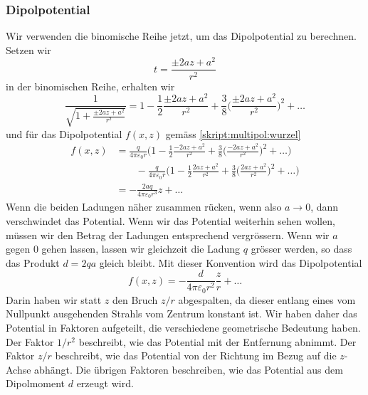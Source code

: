 \subsubsection{Dipolpotential}
Wir verwenden die binomische Reihe jetzt, um das Dipolpotential
zu berechnen.
Setzen wir 
\[
t=\frac{\pm 2az+a^2}{r^2}
\]
in der binomischen Reihe, erhalten wir
\[
\frac{1}{\sqrt{\displaystyle 1+\frac{\pm 2az+a^2}{r^2}}}
=
1-\frac12\frac{\pm 2az+a^2}{r^2}
+
\frac38 \biggl(\frac{\pm 2az+a^2}{r^2}\biggr)^2+\dots
\]
und für das Dipolpotential $f(x,z)$ gemäss \eqref{skript:multipol:wurzel}
\begin{align*}
f(x,z)
&=
\frac{q}{4\pi\varepsilon_0 r}
\biggl(
1-\frac12\frac{-2az+a^2}{r^2} + \frac38 \biggl(\frac{-2az+a^2}{r^2}\biggr)^2+\dots
\biggr)
\\
&\qquad
-
\frac{q}{4\pi\varepsilon_0 r}
\biggl(
1-\frac12\frac{2az+a^2}{r^2} + \frac38 \biggl(\frac{2az+a^2}{r^2}\biggr)^2+\dots
\biggr)
\\
&=
-\frac{2aq}{4\pi\varepsilon_0r^3}z + \dots
\end{align*}
Wenn die beiden Ladungen näher zusammen rücken, wenn also $a\to 0$,
dann verschwindet das Potential.
Wenn wir das Potential weiterhin sehen wollen, müssen wir den Betrag
der Ladungen entsprechend vergrössern.
Wenn wir $a$ gegen $0$ gehen lassen, lassen wir gleichzeit die Ladung
$q$ grösser werden, so dass das Produkt $d=2qa$ gleich bleibt.
Mit dieser Konvention wird das Dipolpotential
\begin{equation}
f(x,z) = -\frac{d}{4\pi\varepsilon_0 r^2}\frac{z}{r}+\dots
\label{skript:multipol:dipolpotential}
\end{equation}
Darin haben wir statt $z$ den Bruch $z/r$ abgespalten, da dieser
entlang eines vom Nullpunkt ausgehenden Strahls vom Zentrum
konstant ist.
Wir haben daher das Potential in Faktoren aufgeteilt, die verschiedene
geometrische Bedeutung haben.
Der Faktor $1/r^2$ beschreibt, wie das Potential mit der Entfernung abnimmt.
Der Faktor $z/r$ beschreibt, wie das Potential von der Richtung im
Bezug auf die $z$-Achse abhängt.
Die übrigen Faktoren beschreiben, wie das Potential aus dem Dipolmoment
$d$ erzeugt wird.

